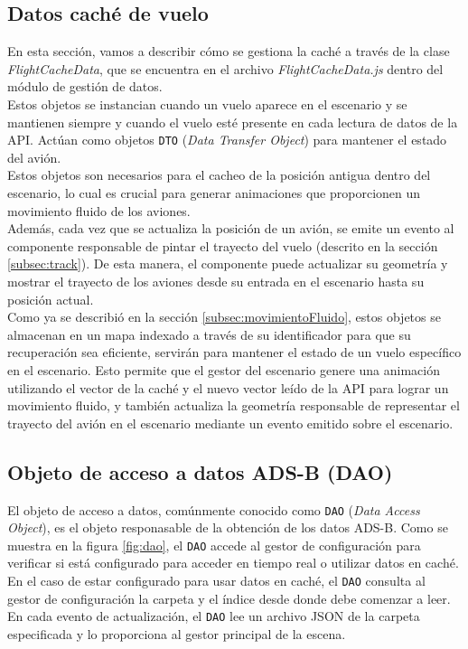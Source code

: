 \documentclass[a4paper, 11pt]{book}
\begin{document}
\subsection{Datos caché de vuelo}
\label{subsec:datosCacheVuelo}
En esta sección, vamos a describir cómo se gestiona la caché a través de la clase \emph{FlightCacheData}, que se encuentra en el archivo \emph{FlightCacheData.js} dentro del módulo de gestión de datos.\\
Estos objetos se instancian cuando un vuelo aparece en el escenario y se mantienen siempre y cuando el vuelo esté presente en cada lectura de datos de la \textsc{API}. Actúan como objetos \texttt{DTO} (\emph{Data Transfer Object}) para mantener el estado del avión.\\
Estos objetos son necesarios para el cacheo de la posición antigua dentro del escenario, lo cual es crucial para generar animaciones que proporcionen un movimiento fluido de los aviones. \\
Además, cada vez que se actualiza la posición de un avión, se emite un evento al componente responsable de pintar el trayecto del vuelo (descrito en la sección \ref{subsec:track}). De esta manera, el componente puede actualizar su geometría y mostrar el trayecto de los aviones desde su entrada en el escenario hasta su posición actual.
\\
Como ya se describió en la sección \ref{subsec:movimientoFluido}, estos objetos se almacenan en un mapa indexado a través de su identificador para que su recuperación sea eficiente, servirán para mantener el estado de un vuelo específico en el escenario. Esto permite que el gestor del escenario genere una animación utilizando el vector de la caché y el nuevo vector leído de la API para lograr un movimiento fluido, y también actualiza la geometría responsable de representar el trayecto del avión en el escenario mediante un evento emitido sobre el escenario.
\subsection{Objeto de acceso a datos ADS-B (DAO)}
\label{subsec:dao}
El objeto de acceso a datos, comúnmente conocido como \texttt{DAO} (\emph{Data Access Object}), es el objeto responasable de la obtención de los datos ADS-B. Como se muestra en la figura \ref{fig:dao}, el \texttt{DAO} accede al gestor de configuración para verificar si está configurado para acceder en tiempo real o utilizar datos en caché. \\
En el caso de estar configurado para usar datos en caché, el \texttt{DAO} consulta al gestor de configuración la carpeta y el índice desde donde debe comenzar a leer. En cada evento de actualización, el \texttt{DAO} lee un archivo \textsc{JSON} de la carpeta especificada y lo proporciona al gestor principal de la escena.
\end{document}
